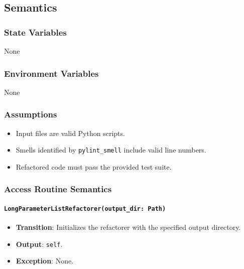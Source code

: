 \documentclass[12pt, titlepage]{article}
\begin{document}
\subsection{Semantics}

\subsubsection{State Variables}

None

\subsubsection{Environment Variables}
None

\subsubsection{Assumptions}

\begin{itemize}
  \item Input files are valid Python scripts.
  \item Smells identified by \texttt{pylint\_smell} include valid line numbers.
  \item Refactored code must pass the provided test suite.
\end{itemize}

\subsubsection{Access Routine Semantics}

\paragraph{\texttt{LongParameterListRefactorer(output\_dir: Path)}}
\begin{itemize}
\item \textbf{Transition}: Initializes the refactorer with the specified output directory.
\item \textbf{Output}: \texttt{self}.
\item \textbf{Exception}: None.
\end{itemize}
\end{document}
